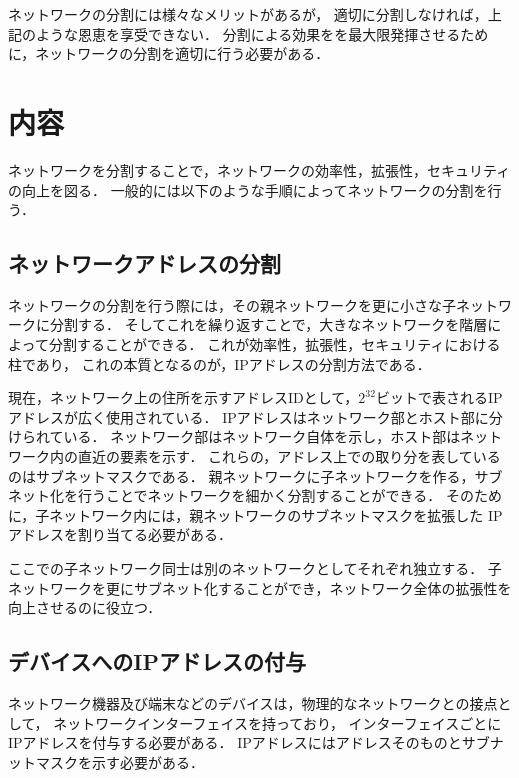 \documentclass{jlreq}
\begin{document}

ネットワークの分割には様々なメリットがあるが，
適切に分割しなければ，上記のような恩恵を享受できない．
分割による効果をを最大限発揮させるために，ネットワークの分割を適切に行う必要がある．

\section{内容}

ネットワークを分割することで，ネットワークの効率性，拡張性，セキュリティの向上を図る．
一般的には以下のような手順によってネットワークの分割を行う．

\subsection*{ネットワークアドレスの分割}
ネットワークの分割を行う際には，その親ネットワークを更に小さな子ネットワークに分割する．
そしてこれを繰り返すことで，大きなネットワークを階層によって分割することができる．
これが効率性，拡張性，セキュリティにおける柱であり，
これの本質となるのが，IPアドレスの分割方法である．

現在，ネットワーク上の住所を示すアドレスIDとして，$2^{32}$ビットで表されるIPアドレスが広く使用されている．
IPアドレスはネットワーク部とホスト部に分けられている．
ネットワーク部はネットワーク自体を示し，ホスト部はネットワーク内の直近の要素を示す．
これらの，アドレス上での取り分を表しているのはサブネットマスクである．
親ネットワークに子ネットワークを作る，サブネット化を行うことでネットワークを細かく分割することができる．
そのために，子ネットワーク内には，親ネットワークのサブネットマスクを拡張した
IPアドレスを割り当てる必要がある．

ここでの子ネットワーク同士は別のネットワークとしてそれぞれ独立する．
子ネットワークを更にサブネット化することができ，ネットワーク全体の拡張性を向上させるのに役立つ．

\subsection*{デバイスへのIPアドレスの付与}
ネットワーク機器及び端末などのデバイスは，物理的なネットワークとの接点として，
ネットワークインターフェイスを持っており，
インターフェイスごとにIPアドレスを付与する必要がある．
IPアドレスにはアドレスそのものとサブナットマスクを示す必要がある．
\end{document}
